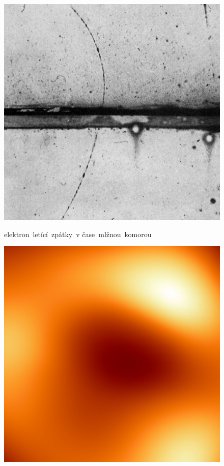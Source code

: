 \documentclass{../../../../style/mkimain}
\begin{document}
\begin{figure}[H]
    \includegraphics[width=\linewidth]{images/pozitron.jpg}
    \begin{center}
        elektron~letící~zpátky~v čase~mlžnou~komorou
      \end{center}
  \endminipage\hfill
    \includegraphics[width=\linewidth]{images/sagittarius.jpg}

\end{figure}
\end{document}
